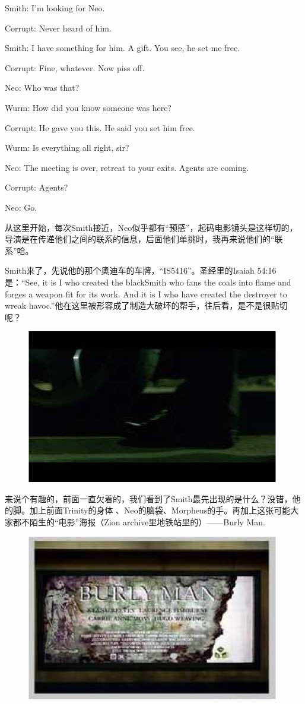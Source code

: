 \documentclass{ctexart}
\newenvironment{myquote}{\color{green} \setlength{\leftskip}{6em} \setlength{\rightskip}{4em} \setlength{\parindent}{-2em}}{\par}
\begin{document}
\begin{myquote}
Smith: I'm looking for Neo.

Corrupt: Never heard of him.

Smith: I have something for him. A gift. You see, he set me free.

Corrupt: Fine, whatever. Now piss off.

Neo: Who was that?

Wurm: How did you know someone was here?

Corrupt: He gave you this. He said you set him free.

Wurm: Is everything all right, sir?

Neo: The meeting is over, retreat to your exits. Agents are coming.

Corrupt: Agents?

Neo: Go.
\end{myquote}

从这里开始，每次Smith接近，Neo似乎都有“预感”，起码电影镜头是这样切的，导演是在传递他们之间的联系的信息，后面他们单挑时，我再来说他们的“联系”哈。

Smith来了，先说他的那个奥迪车的车牌，“IS5416”。圣经里的Isaiah 54:16是：“See, it is I who created the blackSmith who fans the coals into flame and forges a weapon fit for its work. And it is I who have created the destroyer to wreak havoc.”他在这里被形容成了制造大破坏的帮手，往后看，是不是很贴切呢？

\begin{figure}[htb]
\centering
\includegraphics[width=0.5\linewidth]{fig/read_reloaded-18}
\end{figure}

来说个有趣的，前面一直欠着的，我们看到了Smith最先出现的是什么？没错，他的脚。加上前面Trinity的身体 、Neo的脑袋、Morpheus的手。再加上这张可能大家都不陌生的“电影”海报（Zion archive里地铁站里的）——Burly Man.

\begin{figure}[htb]
\centering
\includegraphics[width=0.5\linewidth]{fig/read_reloaded-19}
\end{figure}
\end{document}
